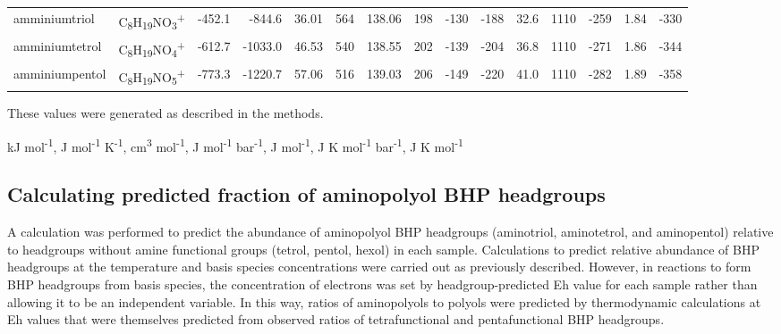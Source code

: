 {\begin{landscape}
\begin{table}
\begin{adjustbox}{width=600pt,keepaspectratio}
\begin{threeparttable}
\begin{tabular}{llrrrrrrrrrrrrr}
amminiumtriol & C\textsubscript{8}H\textsubscript{19}NO\textsubscript{3}\textsuperscript{+} & -452.1 & -844.6 & 36.01 & 564   & 138.06 & 198   & -130  & -188  & 32.6  & 1110  & -259  & 1.84  & -330 \\
amminiumtetrol & C\textsubscript{8}H\textsubscript{19}NO\textsubscript{4}\textsuperscript{+} & -612.7 & -1033.0 & 46.53 & 540   & 138.55 & 202   & -139  & -204  & 36.8  & 1110  & -271  & 1.86  & -344 \\
amminiumpentol & C\textsubscript{8}H\textsubscript{19}NO\textsubscript{5}\textsuperscript{+} & -773.3 & -1220.7 & 57.06 & 516   & 139.03 & 206   & -149  & -220  & 41.0  & 1110  & -282  & 1.89  & -358 \\
\bottomrule
\end{tabular}%


  \begin{tablenotes}
    These values were generated as described in the methods.
    
     kJ mol\textsuperscript{-1},
     J mol\textsuperscript{-1} K\textsuperscript{-1},
     cm\textsuperscript{3} mol\textsuperscript{-1},
     J mol\textsuperscript{-1} bar\textsuperscript{-1},
     J mol\textsuperscript{-1},
     J K mol\textsuperscript{-1} bar\textsuperscript{-1},
     J K mol\textsuperscript{-1}


  \end{tablenotes}
  
  \label{tab:BHP_thermo_props}
  \end{threeparttable}
  \end{adjustbox}
\end{table}
\doublespace
\end{landscape}
\setcounter{tabcounter}{0} %
\clearpage
}

\subsection{Calculating predicted fraction of aminopolyol BHP headgroups}

A calculation was performed to predict the abundance of aminopolyol BHP headgroups (aminotriol, aminotetrol, and aminopentol) relative to headgroups without amine functional groups (tetrol, pentol, hexol) in each sample. Calculations to predict relative abundance of BHP headgroups at the temperature and basis species concentrations were carried out as previously described. However, in reactions to form BHP headgroups from basis species, the concentration of electrons was set by headgroup-predicted Eh value for each sample rather than allowing it to be an independent variable. In this way, ratios of aminopolyols to polyols were predicted by thermodynamic calculations at Eh values that were themselves predicted from observed ratios of tetrafunctional and pentafunctional BHP headgroups.


